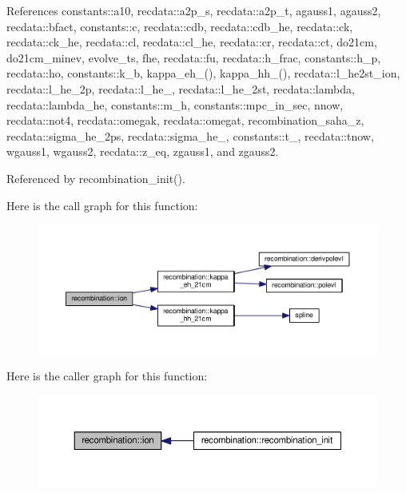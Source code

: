 References constants\+::a10, recdata\+::a2p\+\_\+s, recdata\+::a2p\+\_\+t, agauss1, agauss2, recdata\+::bfact, constants\+::c, recdata\+::cdb, recdata\+::cdb\+\_\+he, recdata\+::ck, recdata\+::ck\+\_\+he, recdata\+::cl, recdata\+::cl\+\_\+he, recdata\+::cr, recdata\+::ct, do21cm, do21cm\+\_\+minev, evolve\+\_\+ts, fhe, recdata\+::fu, recdata\+::h\+\_\+frac, constants\+::h\+\_\+p, recdata\+::ho, constants\+::k\+\_\+b, kappa\+\_\+eh\+\_\+21cm(), kappa\+\_\+hh\+\_\+21cm(), recdata\+::l\+\_\+he2st\+\_\+ion, recdata\+::l\+\_\+he\+\_\+2p, recdata\+::l\+\_\+he\+\_\+2pt, recdata\+::l\+\_\+he\+\_\+2st, recdata\+::lambda, recdata\+::lambda\+\_\+he, constants\+::m\+\_\+h, constants\+::mpc\+\_\+in\+\_\+sec, nnow, recdata\+::not4, recdata\+::omegak, recdata\+::omegat, recombination\+\_\+saha\+\_\+z, recdata\+::sigma\+\_\+he\+\_\+2ps, recdata\+::sigma\+\_\+he\+\_\+2pt, constants\+::t\+\_\+21cm, recdata\+::tnow, wgauss1, wgauss2, recdata\+::z\+\_\+eq, zgauss1, and zgauss2.



Referenced by recombination\+\_\+init().

Here is the call graph for this function\+:
\nopagebreak
\begin{figure}[H]
\begin{center}
\leavevmode
\includegraphics[width=350pt]{namespacerecombination_a5f644f40f1384d3dd16e675369854f63_cgraph}
\end{center}
\end{figure}
Here is the caller graph for this function\+:
\nopagebreak
\begin{figure}[H]
\begin{center}
\leavevmode
\includegraphics[width=350pt]{namespacerecombination_a5f644f40f1384d3dd16e675369854f63_icgraph}
\end{center}
\end{figure}
\mbox{\label{namespacerecombination_ad379abd3309c2fd3f5cacb8b614b80a5}} 
